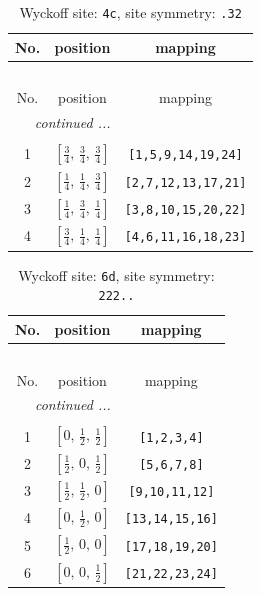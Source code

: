 \documentclass[fleqn,8pt]{jsarticle}
\begin{document}
\renewcommand{\arraystretch}{1.2}
\begin{longtable}{ccc}
\caption{Wyckoff site: {\tt 4c}, site symmetry: {\tt .32}}
 \\
 \hline \hline
No. & position & mapping \\ \hline \endfirsthead

\multicolumn{2}{l}{\tablename\ \thetable{}} \\
 \hline \hline
No. & position & mapping \\ \hline \endhead

 \hline \hline
\multicolumn{2}{r}{\footnotesize\it continued ...} \\ \endfoot

 \hline \hline
\multicolumn{2}{r}{} \\ \endlastfoot

1 & $\left[ \frac{3}{4},\, \frac{3}{4},\, \frac{3}{4} \right]$ & {\tt [1,5,9,14,19,24]} \\ \hline
2 & $\left[ \frac{1}{4},\, \frac{1}{4},\, \frac{3}{4} \right]$ & {\tt [2,7,12,13,17,21]} \\ \hline
3 & $\left[ \frac{1}{4},\, \frac{3}{4},\, \frac{1}{4} \right]$ & {\tt [3,8,10,15,20,22]} \\ \hline
4 & $\left[ \frac{3}{4},\, \frac{1}{4},\, \frac{1}{4} \right]$ & {\tt [4,6,11,16,18,23]} \\
\end{longtable}
\renewcommand{\arraystretch}{1.2}
\begin{longtable}{ccc}
\caption{Wyckoff site: {\tt 6d}, site symmetry: {\tt 222..}}
 \\
 \hline \hline
No. & position & mapping \\ \hline \endfirsthead

\multicolumn{2}{l}{\tablename\ \thetable{}} \\
 \hline \hline
No. & position & mapping \\ \hline \endhead

 \hline \hline
\multicolumn{2}{r}{\footnotesize\it continued ...} \\ \endfoot

 \hline \hline
\multicolumn{2}{r}{} \\ \endlastfoot

1 & $\left[ 0,\, \frac{1}{2},\, \frac{1}{2} \right]$ & {\tt [1,2,3,4]} \\ \hline
2 & $\left[ \frac{1}{2},\, 0,\, \frac{1}{2} \right]$ & {\tt [5,6,7,8]} \\ \hline
3 & $\left[ \frac{1}{2},\, \frac{1}{2},\, 0 \right]$ & {\tt [9,10,11,12]} \\ \hline
4 & $\left[ 0,\, \frac{1}{2},\, 0 \right]$ & {\tt [13,14,15,16]} \\ \hline
5 & $\left[ \frac{1}{2},\, 0,\, 0 \right]$ & {\tt [17,18,19,20]} \\ \hline
6 & $\left[ 0,\, 0,\, \frac{1}{2} \right]$ & {\tt [21,22,23,24]} \\
\end{longtable}
\end{document}
